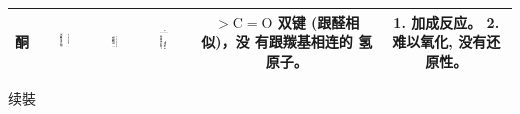 \documentclass[10pt]{article}
\begin{document}
\begin{center}
{\begin{tabular}{|c|c|c|c|c|c|}
\hline
酮 & \includegraphics[max width=0.2\textwidth]{images/01912d16-be99-77bb-9535-4f3ed8d9946f_156_495545.jpg} & \includegraphics[max width=0.2\textwidth]{images/01912d16-be99-77bb-9535-4f3ed8d9946f_156_495546.jpg} & \includegraphics[max width=0.2\textwidth]{images/01912d16-be99-77bb-9535-4f3ed8d9946f_156_495547.jpg} & \(> \mathrm{C} = \mathrm{O}\) 双键 (跟醛相似)，没 有跟羰基相连的 氢原子。 & 1. 加成反应。 2. 难以氧化, 没有还原性。 \\
\hline
\end{tabular}
}
\end{center}

续裝
\end{document}
